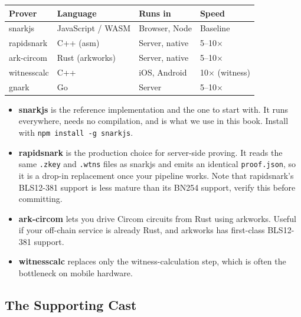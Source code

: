 \begin{center}
\begin{tabular}{llll}
  \hline
  \textbf{Prover} & \textbf{Language} & \textbf{Runs in} & \textbf{Speed} \\
  \hline
  snarkjs            & JavaScript / WASM & Browser, Node & Baseline \\
  rapidsnark         & C++ (asm)         & Server, native & 5--10$\times$ \\
  ark-circom         & Rust (arkworks)   & Server, native & 5--10$\times$ \\
  witnesscalc        & C++               & iOS, Android   & 10$\times$ (witness) \\
  gnark              & Go                & Server         & 5--10$\times$ \\
  \hline
\end{tabular}
\end{center}

\begin{itemize}
  \item \textbf{snarkjs} is the reference implementation and the one to start
        with. It runs everywhere, needs no compilation, and is what we use in
        this book. Install with \texttt{npm install -g snarkjs}.
  \item \textbf{rapidsnark} is the production choice for server-side proving.
        It reads the same \texttt{.zkey} and \texttt{.wtns} files as snarkjs and
        emits an identical \texttt{proof.json}, so it is a drop-in replacement
        once your pipeline works. Note that rapidsnark's BLS12-381 support is
        less mature than its BN254 support, verify this before committing.
  \item \textbf{ark-circom} lets you drive Circom circuits from Rust using
        arkworks. Useful if your off-chain service is already Rust, and
        arkworks has first-class BLS12-381 support.
  \item \textbf{witnesscalc} replaces only the witness-calculation step, which
        is often the bottleneck on mobile hardware.
\end{itemize}

\subsection*{The Supporting Cast}

